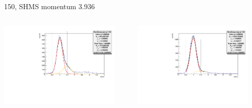 \documentclass[aspectratio=169,xcolor=dvipsnames]{beamer}
\begin{document}
\begin{frame}{150, SHMS momentum 3.936}
\begin{columns}
\begin{column}[T]{0.5\textwidth}
\includegraphics[width = 0.9\textwidth]{results/pid/rftime/rftime_pos_150_pi.pdf}
\end{column}
\begin{column}[T]{0.5\textwidth}
\includegraphics[width = 0.9\textwidth]{results/pid/rftime/rftime_neg_150_pi.pdf}
\end{column}
\end{columns}
\end{frame}
\end{document}
